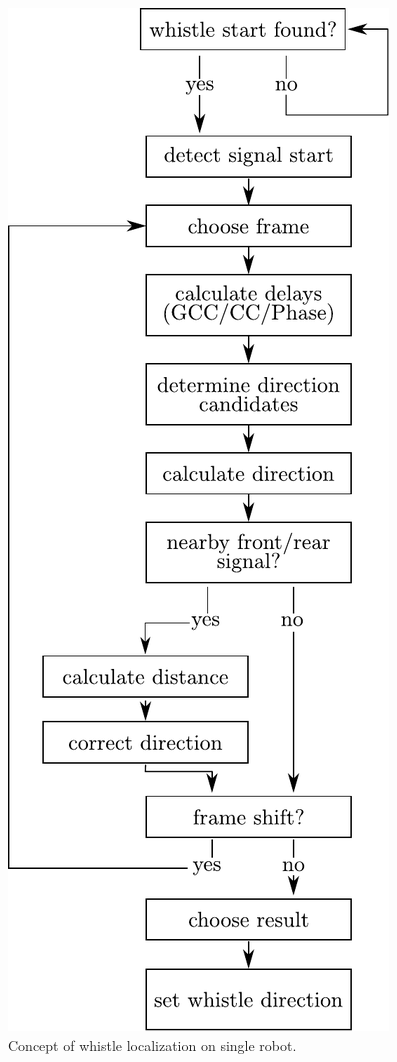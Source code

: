\begin{figure}[ht]
	\centering
		\includegraphics[height=0.7\textheight]{figures/state_machine}
	\caption{Concept of whistle localization on single robot.}
	\label{fig:04_stateMachine}
\end{figure}





